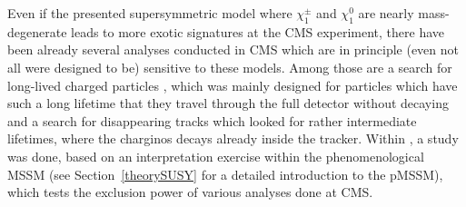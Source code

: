 Even if the presented supersymmetric model where $\chi^{\pm}_1$ and $\chi^{0}_1$ are nearly mass-degenerate leads to more exotic signatures at the CMS experiment, there have been already several analyses conducted in CMS which are in principle (even not all were designed to be) sensitive to these models.
Among those are a search for long-lived charged particles \cite{bib:CMS:HSCP_8TeV}, which was mainly designed for particles which have such a long lifetime that they travel through the full detector without decaying and a search for disappearing tracks \cite{bib:CMS:DT_8TeV} which looked for rather intermediate lifetimes, where the charginos decays already inside the tracker. 
Within \cite{bib:CMS:DT_8TeV}, a study was done, based on an interpretation exercise \cite{bib:CMS:HSCPReinterpreation_PAS} within the phenomenological MSSM (see Section~\ref{theorySUSY} for a detailed introduction to the pMSSM), which tests the exclusion power of various analyses done at CMS.

